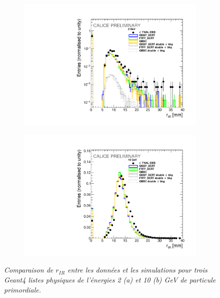 \begin{figure}
	\centering
	\begin{subfigure}{0.5\textwidth}
		\centering
		\includegraphics[width=.90\linewidth]{ECAL/plots/r-ir-2.pdf}
		\caption{\label{fig:rir2F} }
	\end{subfigure}%
	\begin{subfigure}{0.5\textwidth}
		\centering
		\includegraphics[width=.90\linewidth]{ECAL/plots/r-ir-10.pdf}
		\caption{\label{fig:rir10F} }
	\end{subfigure}
	\caption{\label{fig:rirexampleF} \sl %
		Comparaison de $r_{IR}$ entre les données et les simulations pour trois {\sc Geant}4  listes physiques de l'\'energies 2 (a) et 10 (b) GeV de particule primordiale.}
\end{figure}

